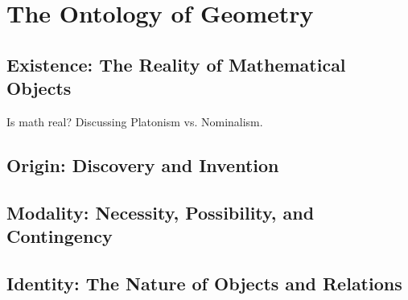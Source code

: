 \documentclass[../../../main/main.tex]{subfiles}
\begin{document}
\chapter{The Ontology of Geometry}

\section{Existence: The Reality of Mathematical Objects}
Is math real? Discussing Platonism vs. Nominalism.

\section{Origin: Discovery and Invention}
\section{Modality: Necessity, Possibility, and Contingency}
\section{Identity: The Nature of Objects and Relations}
\end{document}

